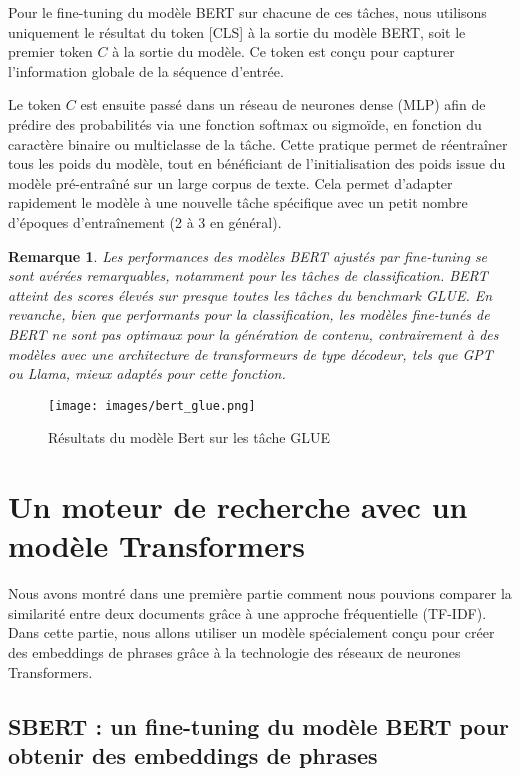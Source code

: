 \documentclass[12pt]{article}
\newtheorem{rmq}{Remarque}
\theoremstyle{definition}
\begin{document}
Pour le fine-tuning du modèle BERT sur chacune de ces tâches, nous utilisons uniquement le résultat du token [CLS] à la sortie du modèle BERT, soit le premier token $C$ à la sortie du modèle. Ce token est conçu pour capturer l'information globale de la séquence d'entrée.

Le token $C$ est ensuite passé dans un réseau de neurones dense (MLP) afin de prédire des probabilités via une fonction softmax ou sigmoïde, en fonction du caractère binaire ou multiclasse de la tâche. Cette pratique permet de réentraîner tous les poids du modèle, tout en bénéficiant de l’initialisation des poids issue du modèle pré-entraîné sur un large corpus de texte. Cela permet d'adapter rapidement le modèle à une nouvelle tâche spécifique avec un petit nombre d'époques d'entraînement (2 à 3 en général).

\begin{rmq}
	Les performances des modèles BERT ajustés par fine-tuning se sont avérées remarquables, notamment pour les tâches de classification. BERT atteint des scores élevés sur presque toutes les tâches du benchmark GLUE. En revanche, bien que performants pour la classification, les modèles fine-tunés de BERT ne sont pas optimaux pour la génération de contenu, contrairement à des modèles avec une architecture de transformeurs de type décodeur, tels que GPT ou Llama, mieux adaptés pour cette fonction.
\end{rmq}


 \begin{figure*}[!h]
	\centering
	\texttt{[image: images/bert\_glue.png]}
	\caption{Résultats du modèle Bert sur les tâche GLUE \cite{bert_paper}}
\end{figure*}


\section{Un moteur de recherche avec un modèle Transformers}

Nous avons montré dans une première partie comment nous pouvions comparer la similarité entre deux documents grâce à une approche fréquentielle (TF-IDF). Dans cette partie, nous allons utiliser un modèle spécialement conçu pour créer des embeddings de phrases grâce à la technologie des réseaux de neurones Transformers.

\subsection{SBERT : un fine-tuning du modèle BERT pour obtenir des embeddings de phrases}
\end{document}
